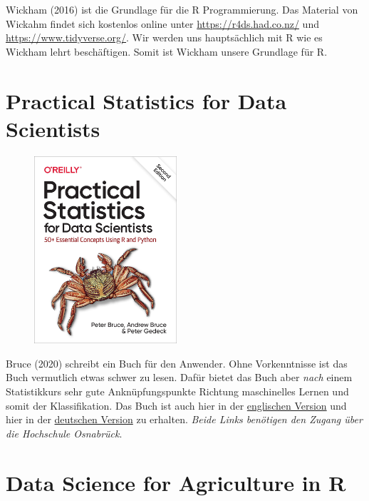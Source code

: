 \documentclass[
  letterpaper,
]{scrbook}
\begin{document}
Wickham (2016) ist die Grundlage für die R Programmierung. Das Material
von Wickahm findet sich kostenlos online unter
\url{https://r4ds.had.co.nz/} und \url{https://www.tidyverse.org/}. Wir
werden uns hauptsächlich mit R wie es Wickham lehrt beschäftigen. Somit
ist Wickham unsere Grundlage für R.

\hypertarget{practical-statistics-for-data-scientists}{%
\section{Practical Statistics for Data
Scientists}\label{practical-statistics-for-data-scientists}}

\begin{figure}

{\centering \includegraphics[width=2.08333in,height=\textheight]{./images/practical.jpg}

}

\end{figure}

Bruce (2020) schreibt ein Buch für den Anwender. Ohne Vorkenntnisse ist
das Buch vermutlich etwas schwer zu lesen. Dafür bietet das Buch aber
\emph{nach} einem Statistikkurs sehr gute Anknüpfungspunkte Richtung
maschinelles Lernen und somit der Klassifikation. Das Buch ist auch hier
in der
\href{https://ebookcentral.proquest.com/lib/hs-osnabrueck/detail.action?docID=6173908}{englischen
Version} und hier in der
\href{http://www.content-select.com/index.php?id=bib_view\&ean=9783960104674}{deutschen
Version} zu erhalten. \emph{Beide Links benötigen den Zugang über die
Hochschule Osnabrück}.

\hypertarget{data-science-for-agriculture-in-r}{%
\section{Data Science for Agriculture in
R}\label{data-science-for-agriculture-in-r}}
\end{document}

